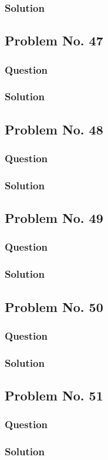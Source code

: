 \documentclass[journal,12pt,twocolumn]{IEEEtran}
\begin{document}
\subsubsection{Solution}


\subsection{Problem No. 47}
\subsubsection{Question}

\subsubsection{Solution}


\subsection{Problem No. 48}
\subsubsection{Question}

\subsubsection{Solution}


\subsection{Problem No. 49}
\subsubsection{Question}

\subsubsection{Solution}


\subsection{Problem No. 50}
\subsubsection{Question}

\subsubsection{Solution}


\subsection{Problem No. 51}
\subsubsection{Question}

\subsubsection{Solution}

\end{document}
